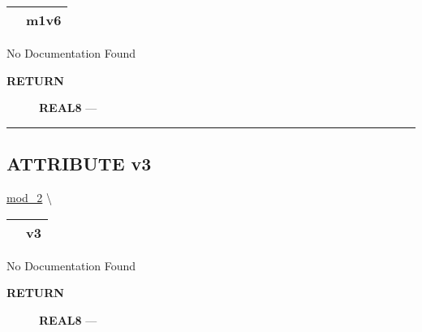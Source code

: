 {\renewcommand{\arraystretch}{1.5}
\begin{tabularx}{\textwidth}{|>{\raggedright\arraybackslash}l|X|}
\hline
\hspace{0pt}\mytexttt{\color{red} } & \textbf{m1v6} \\
\hline
\end{tabularx}
}

\par





No Documentation Found








\par
\begin{description}
\item [\colorbox{tagtype}{\color{white} \textbf{\textsf{RETURN}}}] \textbf{REAL8} --- 
\end{description}




\rule{\linewidth}{0.5pt}


\subsection*{\textsf{\colorbox{headtoc}{\color{white} ATTRIBUTE}
v3}}

\hypertarget{ecldoc:mod_2.v3}{}
\hspace{0pt} \hyperlink{ecldoc:mod_2}{mod_2} \textbackslash 

{\renewcommand{\arraystretch}{1.5}
\begin{tabularx}{\textwidth}{|>{\raggedright\arraybackslash}l|X|}
\hline
\hspace{0pt}\mytexttt{\color{red} } & \textbf{v3} \\
\hline
\end{tabularx}
}

\par





No Documentation Found








\par
\begin{description}
\item [\colorbox{tagtype}{\color{white} \textbf{\textsf{RETURN}}}] \textbf{REAL8} --- 
\end{description}




